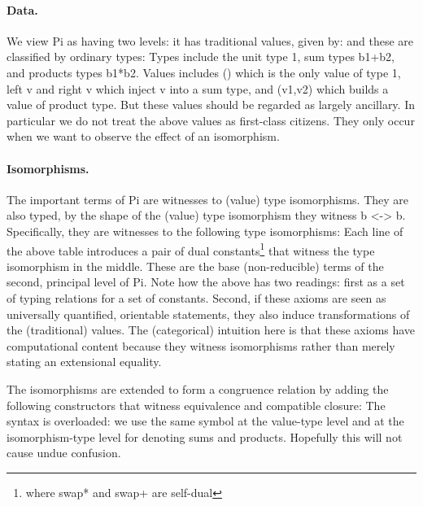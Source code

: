 \documentclass{llncs}
\begin{document}
\paragraph*{Data.}
We view {{Pi}} as having two levels:  it has traditional values, given by:
\noindent and these are classified by ordinary types:
\noindent Types include the unit type {{1}}, sum types {{b1+b2}}, and
products types {{b1*b2}}.  Values includes {{()}} which is the only value of
type {{1}}, {{left v}} and {{right v}} which inject {{v}} into a sum type,
and {{(v1,v2)}} which builds a value of product type. But these values should
be regarded as largely ancillary.  In particular we do not treat the above
values as first-class citizens.  They only occur when we want to observe the
effect of an isomorphism.

\paragraph*{Isomorphisms.} The important terms of {{Pi}} are witnesses to
(value) type isomorphisms.  They are also typed, by the shape of the (value)
type isomorphism they witness {{b <-> b}}.  Specifically, they are witnesses to
the following type isomorphisms:
\noindent Each line of the above table introduces a pair of dual
constants\footnote{where {{swap*}} and {{swap+}} are self-dual} that witness
the type isomorphism in the middle.  These are the base (non-reducible) terms
of the second, principal level of {{Pi}}. Note how the above has two
readings: first as a set of typing relations for a set of constants. Second,
if these axioms are seen as universally quantified, orientable statements,
they also induce transformations of the (traditional) values. The
(categorical) intuition here is that these axioms have computational content
because they witness isomorphisms rather than merely stating an extensional
equality.

The isomorphisms are extended to form a congruence relation by adding the
following constructors that witness equivalence and compatible closure:
%
%
%
\noindent The syntax is overloaded: we use the same symbol at the value-type level
and at the isomorphism-type level for denoting sums and products.  Hopefully
this will not cause undue confusion.
\end{document}
